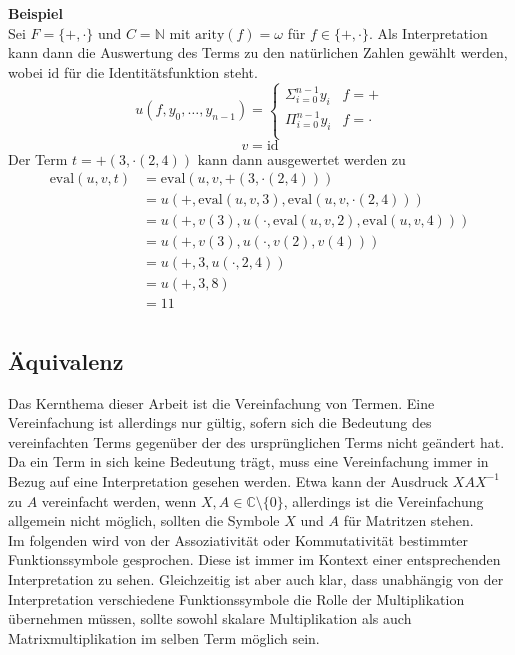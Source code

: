 \documentclass{article}
\begin{document}
\textbf{Beispiel}\\
Sei $F = \{+, \cdot \}$ und $C = \mathbb{N}$ mit $\mathrm{arity}(f) = \omega$ für $f\in \{+, \cdot \}$.
Als Interpretation kann dann die Auswertung des Terms zu den natürlichen Zahlen gewählt werden, wobei $\mathrm{id}$ für die Identitätsfunktion steht.
$$u(f, y_0, \dots, y_{n-1}) = \begin{cases}
\Sigma_{i = 0}^{n-1} y_i & f = +\\
\Pi_{i = 0}^{n-1} y_i & f = \cdot\\
\end{cases}$$
$$v = \mathrm{id}$$
Der Term $t = +(3, \cdot(2, 4))$ kann dann ausgewertet werden zu 
\begin{equation*}
    \begin{split}
    \mathrm{eval}(u, v, t) &= \mathrm{eval}(u, v, +(3, \cdot(2, 4))) \\
    &= u(+, \mathrm{eval}(u, v, 3), \mathrm{eval}(u, v, \cdot(2, 4))) \\
    &= u(+, v(3), u(\cdot, \mathrm{eval}(u, v, 2), \mathrm{eval}(u, v, 4))) \\
    &= u(+, v(3), u(\cdot, v(2), v(4))) \\
    &= u(+, 3, u(\cdot, 2, 4)) \\
    &= u(+, 3, 8) \\
    &= 11 \\
    \end{split}
\end{equation*}

\subsection{Äquivalenz}
Das Kernthema dieser Arbeit ist die Vereinfachung von Termen. Eine Vereinfachung ist allerdings nur gültig, sofern sich die Bedeutung des vereinfachten Terms gegenüber der des ursprünglichen Terms nicht geändert hat. Da ein Term in sich keine Bedeutung trägt, muss eine Vereinfachung immer in Bezug auf eine Interpretation gesehen werden. Etwa kann der Ausdruck $X A X^{-1}$ zu $A$ vereinfacht werden, wenn $X, A \in \mathbb{C} \setminus \{0\}$, allerdings ist die Vereinfachung allgemein nicht möglich, sollten die Symbole $X$ und $A$ für Matritzen stehen. \\
Im folgenden wird von der Assoziativität oder Kommutativität bestimmter Funktionssymbole gesprochen. Diese ist immer im Kontext einer entsprechenden Interpretation zu sehen. Gleichzeitig ist aber auch klar, dass unabhängig von der Interpretation verschiedene Funktionssymbole die Rolle der Multiplikation übernehmen müssen, sollte sowohl skalare Multiplikation als auch Matrixmultiplikation im selben Term möglich sein. 
\end{document}
